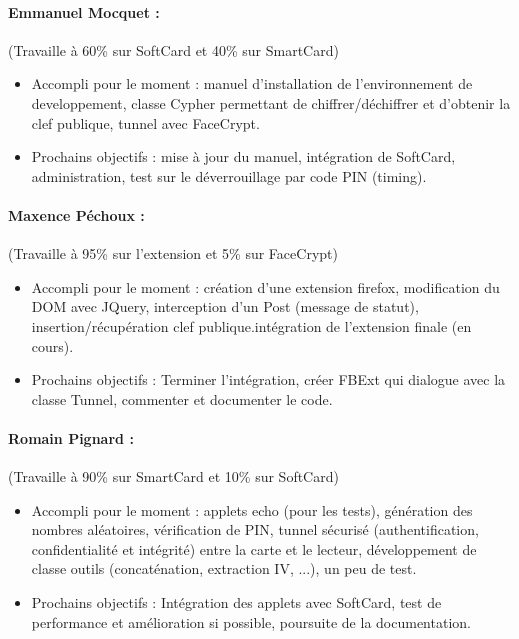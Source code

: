 \documentclass[a4paper,10pt]{article}
\begin{document}
\paragraph{Emmanuel Mocquet : } (Travaille à 60\% sur SoftCard et 40\% sur SmartCard)
\begin{itemize}
    \item Accompli pour le moment : manuel d'installation de l'environnement de 
        developpement, classe Cypher permettant de chiffrer/déchiffrer et
        d'obtenir la clef publique, tunnel avec FaceCrypt.
\item Prochains objectifs : mise à jour du manuel, intégration de SoftCard,
        administration, test sur le déverrouillage par code PIN (timing).
\end{itemize}

\paragraph{Maxence Péchoux : } (Travaille à 95\% sur l'extension et 5\% sur FaceCrypt)
\begin{itemize}
    \item Accompli pour le moment : création d'une extension firefox, modification
        du DOM avec JQuery, interception d'un Post (message de statut), 
        insertion/récupération clef publique.intégration de l'extension finale 
        (en cours).
\item Prochains objectifs : Terminer l'intégration, créer FBExt qui dialogue
        avec la classe Tunnel, commenter et documenter le code.
\end{itemize}

\paragraph{Romain Pignard : } (Travaille à 90\% sur SmartCard et 10\% sur SoftCard)
\begin{itemize}
    \item Accompli pour le moment : applets echo (pour les tests), génération 
        des nombres aléatoires, vérification de PIN, tunnel sécurisé 
        (authentification, confidentialité et intégrité) entre la carte et le 
        lecteur, développement de classe outils (concaténation, 
        extraction IV, ...), un peu de test.
\item Prochains objectifs : Intégration des applets avec SoftCard, test de 
        performance et amélioration si possible, poursuite de la documentation.
\end{itemize}
\end{document}
